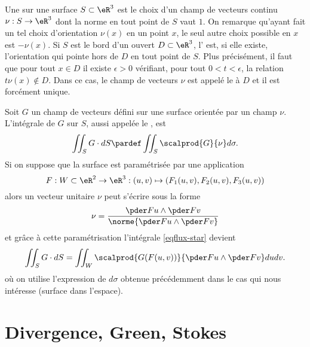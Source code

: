 Une  sur une surface $S \subset \eR^3$ est le choix
d'un champ de vecteurs continu $\nu : S \to \eR^3$ dont la norme en
tout point de $S$ vaut $1$. On remarque qu'ayant fait un tel choix
d'orientation $\nu(x)$ en un point $x$, le seul autre choix possible
en $x$ est $-\nu(x)$.
Si $S$ est le bord d'un ouvert $D \subset \eR^3$, l' est, si elle existe, l'orientation qui
pointe hors de $D$ en tout point de $S$. Plus précisément, il faut que
pour tout $x \in D$ il existe $\epsilon > 0$ vérifiant, pour tout $0 <
t < \epsilon$, la relation $t \nu(x) \notin D$. Dans ce cas, le champ
de vecteurs $\nu$ est appelé le  à $D$ et il est forcément unique.

Soit $G$ un champ de vecteurs défini sur une surface orientée par un
champ $\nu$. L'intégrale de $G$ sur $S$, aussi appelée le , est
\begin{equation}\label{eqflux-star}
  \iint_S G \cdot d S \pardef \iint_S \scalprod{G}{\nu} d \sigma.
\end{equation}
Si on suppose que la surface est paramétrisée par une application
\begin{equation*}
  F : W \subset \eR^2 \to \eR^3 : (u,v) \mapsto (F_1(u,v),F_2(u,v),F_3(u,v))
\end{equation*}
alors un vecteur unitaire $\nu$ peut s'écrire sous la forme
\begin{equation*}
  \nu = \frac{\pder F u \wedge \pder F v}{\norme{\pder F u \wedge \pder F v}}
\end{equation*}
et grâce à cette paramétrisation l'intégrale \eqref{eqflux-star}
devient
\begin{equation*}
  \iint_S G \cdot d S = \iint_W \scalprod{G(F(u,v))}{\pder F u \wedge \pder F v} d u
  d v.
\end{equation*}
où on utilise l'expression de $d \sigma$ obtenue précédemment dans le
cas qui nous intéresse (surface dans l'espace).


\section{Divergence, Green, Stokes}


